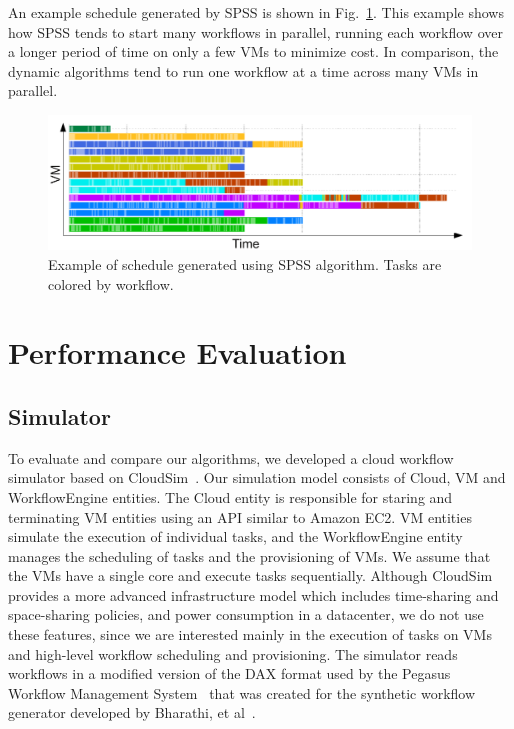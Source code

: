 \documentclass{sig-alternate}
\begin{document}
An example schedule generated by SPSS is shown in Fig.~\ref{fig:spss-example}.
This example shows how SPSS tends to start many workflows in parallel, running
each workflow over a longer period of time on only a few VMs to minimize cost. 
In comparison, the dynamic algorithms tend to run one workflow at a time across 
many VMs in parallel.

\begin{figure}[htb] 
\centering
\includegraphics[width=1.0\columnwidth]{figures/spss-gantt}
 \caption{Example of schedule generated using SPSS algorithm. Tasks are colored by workflow. }
\label{fig:spss-example}
\end{figure}



\section{Performance Evaluation}
\label{sec:performance}



\subsection{Simulator}

To evaluate and compare our algorithms, we developed a cloud workflow simulator based on
CloudSim~\cite{Calheiros11}. Our simulation model consists of Cloud, VM and WorkflowEngine 
entities. The Cloud entity is responsible for staring and terminating VM entities using 
an API similar to Amazon EC2. VM entities simulate the execution of individual tasks,
and the WorkflowEngine entity manages the scheduling of tasks and the provisioning of
VMs. We assume that the VMs have a single core and execute tasks sequentially. Although 
CloudSim provides a more advanced infrastructure model which includes time-sharing and 
space-sharing policies, and power consumption in a datacenter, we do not use these 
features, since we are interested mainly in the execution of tasks on VMs and high-level 
workflow scheduling and provisioning. The simulator reads workflows in a modified version of
the DAX format used by the Pegasus Workflow Management System~\cite{Deelman2005} that was
created for the synthetic workflow generator developed by Bharathi, et al~\cite{Bharathi08}.
\end{document}
